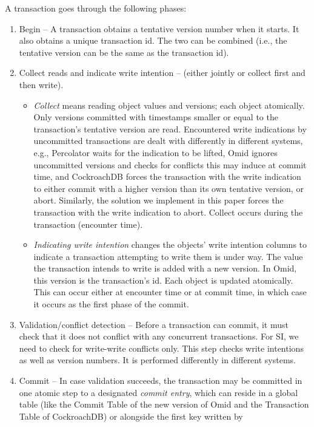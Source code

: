 A transaction goes through the following phases:
\begin{enumerate}
  \item{Begin} -- A transaction obtains a tentative version number when it starts. 
  It also obtains a unique transaction id.
  The two can be combined (i.e., the tentative version can be the same as the  transaction id).
  \item{Collect reads and indicate write intention} -- (either jointly or  collect first and then write).
  	\begin{itemize}
  		\item  \emph{Collect} means reading object values  and versions; each object atomically. 
  		Only versions committed with timestamps  smaller or equal to the transaction's tentative version are read. 
  		Encountered write indications by uncommitted transactions are dealt with differently in different systems, e.g., Percolator 
  		waits for the indication to be lifted, Omid ignores uncommitted versions and checks for conflicts this may induce at
  		commit time, and CockroachDB forces the transaction with the write indication to either commit with a higher version 
  		than its own tentative version, or abort. Similarly, the solution we implement in this paper forces the transaction with the write 
  		indication to abort. 
  		Collect occurs during the transaction (encounter time).
  		\item \emph{Indicating write intention} changes the objects' write intention columns
  		to indicate a transaction attempting to write them is under way. The value the
  		transaction intends to write is added with a new version. In Omid, this
  		version is the transaction's id. Each object is updated atomically. This can
  		occur either at encounter time or at commit time, in which case it occurs as the first phase of the commit. 
  	\end{itemize}
  \item{Validation/conflict detection} -- Before a transaction can commit, it must check that it does not conflict with any 
  concurrent transactions.  For SI, we need to check for write-write conflicts only. 
  This step checks write intentions as well as version numbers. It is performed differently in different systems.
  \item{Commit} --  In case validation succeeds, the transaction may be committed 
  in one atomic step to a designated \emph{commit entry}, which can reside in a global table (like the Commit Table of 
  the new version of Omid and the Transaction Table of CockroachDB) or alongside the first  key written by 

\end{enumerate}
